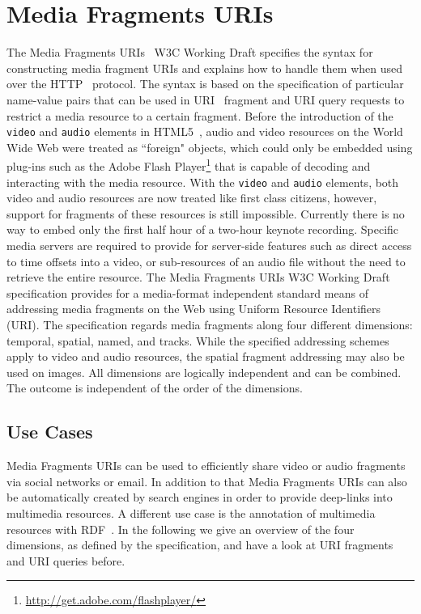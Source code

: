 \documentclass[12pt]{article}
\begin{document}
\section{Media Fragments URIs}
The Media Fragments URIs~\cite{W3C:MediaFrags} W3C Working Draft specifies the syntax for constructing media fragment URIs and explains how to handle them when used over the HTTP~\cite{fielding1999hypertext} protocol. The syntax is based on the specification of particular name-value pairs that can be used in URI~\cite{bernerslee2005uri} fragment and URI query requests to restrict a media resource to a certain fragment. Before the introduction of the \texttt{video} and \texttt{audio} elements in HTML5~\cite{w3c_html5}, audio and video resources on the World Wide Web were treated as ``foreign" objects, which could only be embedded using plug-ins such as the Adobe Flash Player\footnote{\url{http://get.adobe.com/flashplayer/}} that is capable of decoding and interacting with the media resource. With the \texttt{video} and \texttt{audio} elements, both video and audio resources are now treated like first class citizens, however, support for fragments of these resources is still impossible. Currently there is no way to embed only the first half hour of a two-hour keynote recording. Specific media servers are required to provide for server-side features such as direct access to time offsets into a video, or sub-resources of an audio file without the need to retrieve the entire resource. The Media Fragments URIs W3C Working Draft specification provides for a media-format independent standard means of addressing media fragments on the Web using Uniform Resource Identifiers (URI). The specification regards media fragments along four different dimensions: temporal, spatial, named, and tracks. While the specified addressing schemes apply to video and audio resources, the spatial fragment addressing may also be used on images. All dimensions are logically independent and can be combined. The outcome is independent of the order of the dimensions.

\subsection{Use Cases}
Media Fragments URIs can be used to efficiently share video or audio fragments via social networks or email. In addition to that Media Fragments URIs can also be automatically created by search engines in order to provide deep-links into multimedia resources. A different use case is the annotation of multimedia resources with RDF~\cite{RDF}. In the following we give an overview of the four dimensions, as  defined by the specification, and have a look at URI fragments and URI queries before.
\end{document}
